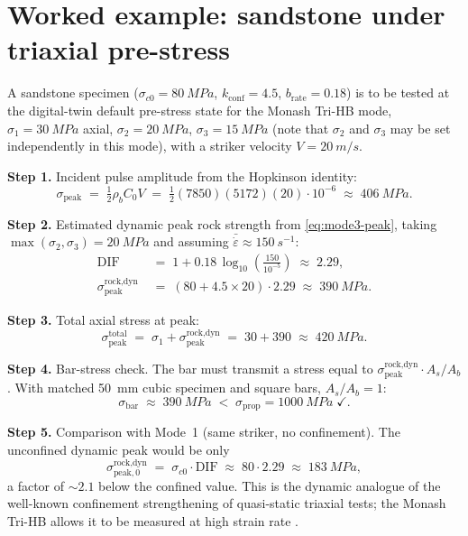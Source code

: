 \documentclass[11pt,a4paper,openany]{book}
\providecommand{\SI}[2]{\qty{#1}{#2}}
\theoremstyle{handbook}
\newcommand{\sig}{\sigma}
\newcommand{\eps}{\varepsilon}
\newcommand{\epsdot}{\dot\eps}
\newcommand{\Cz}{C_0}
\newcommand{\Ab}{A_b}
\newcommand{\As}{A_s}
\newcommand{\sigprop}{\sig_{\text{prop}}}
\newcommand{\sigpeak}{\sig_{\text{peak}}}
\begin{document}
\section{Worked example: sandstone under triaxial pre-stress}

A sandstone specimen ($\sig_{c0}=\SI{80}{MPa}$, $k_{\text{conf}}=4.5$,
$b_{\text{rate}}=0.18$) is to be tested at the digital-twin default
pre-stress state for the Monash Tri-HB mode, $\sig_1=\SI{30}{MPa}$ axial,
$\sig_2=\SI{20}{MPa}$, $\sig_3=\SI{15}{MPa}$ (note that $\sig_2$ and
$\sig_3$ may be set independently in this mode), with a striker velocity
$V=\SI{20}{m/s}$.

\textbf{Step 1.} Incident pulse amplitude from the Hopkinson identity:
\[
  \sigpeak \;=\; \tfrac{1}{2}\rho_b\Cz V
              \;=\; \tfrac{1}{2}(7850)(5172)(20) \cdot 10^{-6}
              \;\approx\; \SI{406}{MPa}.
\]

\textbf{Step 2.} Estimated dynamic peak rock strength from
\eqref{eq:mode3-peak}, taking $\max(\sig_2,\sig_3)=\SI{20}{MPa}$ and
assuming $\bar\epsdot\approx\SI{150}{s^{-1}}$:
\begin{align*}
  \text{DIF} &\;=\; 1 + 0.18\,\log_{10}\!\left(\frac{150}{10^{-5}}\right)
                \;\approx\; 2.29, \\
  \sig_{\text{peak}}^{\text{rock,dyn}}
    &\;=\; (80 + 4.5\times 20)\cdot 2.29
    \;\approx\; \SI{390}{MPa}.
\end{align*}

\textbf{Step 3.} Total axial stress at peak:
\[
  \sigpeak^{\text{total}} \;=\; \sig_1 + \sig_{\text{peak}}^{\text{rock,dyn}}
                          \;=\; 30 + 390 \;\approx\; \SI{420}{MPa}.
\]

\textbf{Step 4.} Bar-stress check. The bar must transmit a stress equal to
$\sig_{\text{peak}}^{\text{rock,dyn}}\cdot \As/\Ab$. With matched
\SI{50}{mm} cubic specimen and square bars, $\As/\Ab=1$:
\[
  \sig_{\text{bar}} \;\approx\; \SI{390}{MPa}
                    \;<\; \sigprop=\SI{1000}{MPa}\;\checkmark.
\]

\textbf{Step 5.} Comparison with Mode~1 (same striker, no confinement).
The unconfined dynamic peak would be only
\[
  \sig_{\text{peak},0}^{\text{rock,dyn}}
    \;=\; \sig_{c0}\cdot\text{DIF}
    \;\approx\; 80\cdot 2.29 \;\approx\; \SI{183}{MPa},
\]
a factor of $\sim 2.1$ below the confined value. This is the dynamic
analogue of the well-known confinement strengthening of quasi-static
triaxial tests; the Monash Tri-HB allows it to be measured at high strain
rate \cite{Liu2019}.
\end{document}
